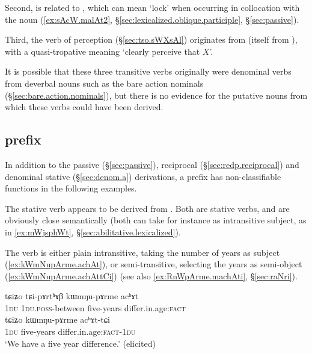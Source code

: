 Second,   is related to , which can mean `lock' when occurring in collocation with the noun  (\ref{ex:sAcW.malAt2}, §\ref{sec:lexicalized.oblique.participle}, §\ref{sec:passive}).

Third,  the verb of perception  (§\ref{sec:tso.sWXsAl}) originates from  (itself from ), with a quasi-tropative meaning  `clearly perceive that $X$'.

It is possible that these three transitive verbs originally were denominal verbs from deverbal nouns such as the bare action nominals (§\ref{sec:bare.action.nominals}), but there is no evidence for the putative nouns from which these verbs could have been derived.

\subsection{ prefix  } \label{sec:a.non.passive.denominal}
In addition to the passive (§\ref{sec:passive}), reciprocal (§\ref{sec:redp.reciprocal}) and denominal stative (§\ref{sec:denom.a}) derivations, a prefix  has non-classifiable functions in the following examples.


The stative verb  appears to be derived from . Both are stative verbs, and are obviously close semantically (both can take for instance  as intransitive subject, as in \ref{ex:mWjsphWt}, §\ref{sec:abilitative.lexicalized}). 

The verb  is either plain intransitive, taking the number of years as subject (\ref{ex:kWmNupArme.achAt}), or semi-transitive, selecting the years as semi-object (\ref{ex:kWmNupArme.achAttCi})  (see also \ref{ex:RnWpArme.machAti}, §\ref{sec:raNri}).

\begin{exe}
\ex \label{ex:kWmNupArme.achAt}
\begin{xlist}
\ex 
\gll tɕiʑo tɕi-pɤrtʰɤβ kɯmŋu-pɤrme acʰɤt \\
\textsc{1du} \textsc{1du}.\textsc{poss}-between five-years differ.in.age:\textsc{fact} \\
\ex \label{ex:kWmNupArme.achAttCi}
\gll tɕiʑo kɯmŋu-pɤrme acʰɤt-tɕi \\
\textsc{1du} five-years differ.in.age:\textsc{fact}-\textsc{1du} \\
\glt `We have a five year difference.' (elicited)
\end{xlist}
\end{exe}


